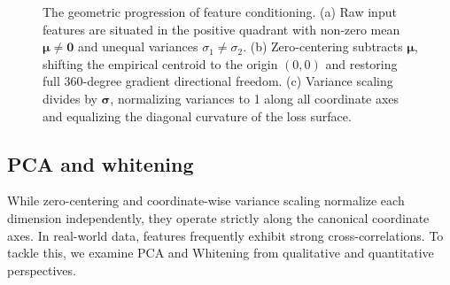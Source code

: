 \begin{figure}[H]
\caption{The geometric progression of feature conditioning. (a) Raw input features are situated in the positive quadrant with non-zero mean $\boldsymbol{\mu} \ne \mathbf{0}$ and unequal variances $\sigma_1 \ne \sigma_2$. (b) Zero-centering subtracts $\boldsymbol{\mu}$, shifting the empirical centroid to the origin $(0, 0)$ and restoring full 360-degree gradient directional freedom. (c) Variance scaling divides by $\boldsymbol{\sigma}$, normalizing variances to 1 along all coordinate axes and equalizing the diagonal curvature of the loss surface.}
\label{fig:centering_scaling_geometry}
\end{figure}

\subsection{PCA and whitening}
\label{sec:pca_and_whitening}

While zero-centering and coordinate-wise variance scaling normalize each dimension independently, they operate strictly along the canonical coordinate axes. In real-world data, features frequently exhibit strong cross-correlations. To tackle this, we examine PCA and Whitening from qualitative and quantitative perspectives.

